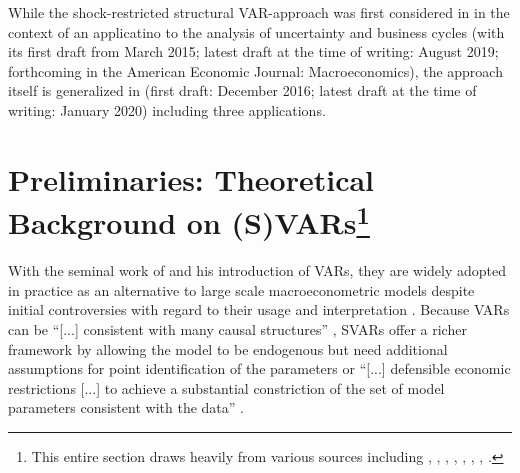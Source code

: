 \documentclass[a4paper,11pt,listof=nochaptergap,oneside,pointednumbers,bibtotoc,bigheadings,liststotoc]{scrbook}
\theoremstyle{mysatz}
\theoremstyle{mydefinition}
\theoremstyle{mytheorem}
\theoremstyle{mybemerkung}
\begin{document}
While the shock-restricted structural VAR-approach was first considered in \citet{ludvigsonetal:18} in the context of an applicatino to the analysis of uncertainty and business cycles (with its first draft from March 2015; latest draft at the time of writing: August 2019; forthcoming in the American Economic Journal: Macroeconomics), the approach itself is generalized in \citet{ludvigsonetal:17} (first draft: December 2016; latest draft at the time of writing: January 2020) including three applications.

\section[Preliminaries: Theoretical Background on (S)VARs]{Preliminaries: Theoretical Background on (S)VARs\footnote{This entire section draws heavily from various sources including \citet{hamilton:94}, \citet{lutkepohl:05}, \citet{stockwatson:01}, \citet{villaramirez:10}, \citet{kunst:07}, \citet{whelan:16}, \citet{zivot:00}, \citet{foroni:14}.}}
With the seminal work of \citet{sims:80} and his introduction of VARs, they are widely adopted in practice as an alternative to large scale macroeconometric models despite initial controversies with regard to their usage and interpretation \citep{canova:95, canova:95b}. Because VARs can be ``[...] consistent with many causal structures'' \citep[p. 1]{ludvigsonetal:17}, SVARs offer a richer framework by allowing the model to be endogenous but need additional assumptions for point identification of the parameters or ``[...] defensible economic restrictions [...] to achieve a substantial constriction of the set of model parameters consistent with the data'' \citep[p. 1]{ludvigsonetal:17}.

\label{sec:TheoreticalBackgroundSVARs}
\end{document}
